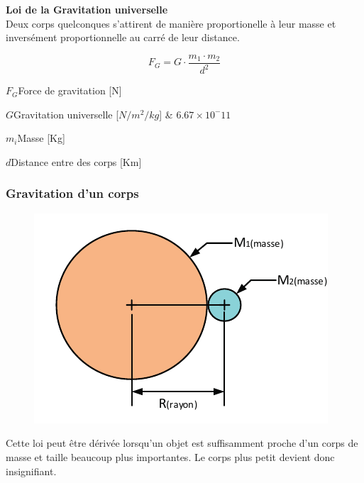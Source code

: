 \documentclass[12pt,a4paper]{article} %
\newcommand\frametitle[1]{ {\bfseries #1} \\[5pt] }
\begin{document}
\begin{mdframed}[leftmargin=2em, rightmargin=2em]
	\frametitle{Loi de la Gravitation universelle}
	Deux corps quelconques s'attirent de manière proportionelle à leur masse et inversément proportionnelle au carré de leur distance. \\
	\par\hspace{0.5em}
	\begin{twocols}[0.3][0.3]
		\[F_G = G\cdot\frac{m_1 \cdot m_2}{d^2}\]
		\nextcol
		\begin{vardef}
			\item{$F_G$}{Force de gravitation [N]}
			\item{$G$}{Gravitation universelle [$N/m^2/kg$]}
					  & $6.67 \times 10^-11$ \\
			\item{$m_i$}{Masse [Kg]}
			\item{$d$}{Distance entre des corps [Km]}
		\end{vardef}
	\end{twocols}
\end{mdframed}
\par\hspace{1em}

\subsubsection*{Gravitation d'un corps}

\begin{figure}[h]
	\centering
	\includegraphics{Newton-Gravitation-Attraction}
\end{figure}
Cette loi peut être dérivée lorsqu'un objet est suffisamment proche d'un corps de masse et taille beaucoup plus importantes. Le corps plus petit devient donc insignifiant.
\end{document}
